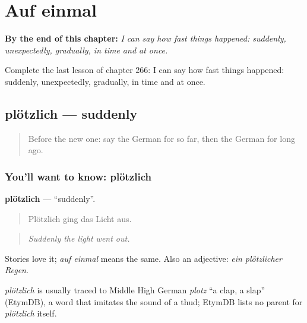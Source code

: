 
\chapter{Auf einmal}
\label{ch:ge-auf-einmal}

\begin{chapteropening}
\textbf{By the end of this chapter:} \emph{I can say how fast things happened: suddenly, unexpectedly, gradually, in time and at once.}

Complete the last lesson of chapter 266: I can say how fast things happened: suddenly, unexpectedly, gradually, in time and at once.
\end{chapteropening}

\section[plötzlich]{plötzlich — suddenly}

\label{lesson:GE-C266-ploetzlich}



\begin{quote}
Before the new one: say the German for so far, then the German for long ago.
\end{quote}

\subsection*{You'll want to know: plötzlich}
\textbf{plötzlich} — \textquotedblleft{}suddenly\textquotedblright{}.

\begin{quote}
Plötzlich ging das Licht aus.
\end{quote}

\begin{quote}
\emph{Suddenly the light went out.}
\end{quote}

Stories love it; \emph{auf einmal} means the same. Also an adjective: \emph{ein plötzlicher Regen}.

\begin{cousinweb}
\emph{plötzlich} is usually traced to Middle High German \emph{plotz} \textquotedblleft{}a clap, a slap\textquotedblright{} (EtymDB), a word that imitates the sound of a thud; EtymDB lists no parent for \emph{plötzlich} itself.
\end{cousinweb}

